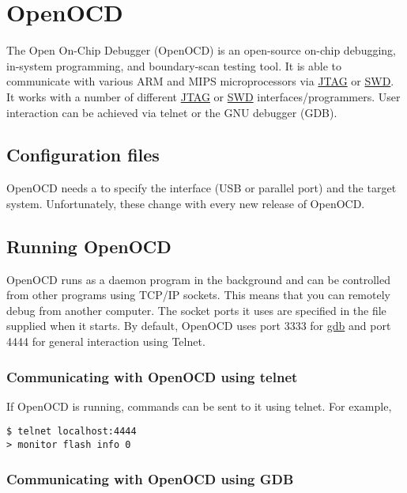 \chapter{OpenOCD}

The Open On-Chip Debugger (OpenOCD) is an open-source on-chip debugging,
in-system programming, and boundary-scan testing tool. It is able to
communicate with various ARM and MIPS microprocessors via \url{JTAG} or
\url{SWD}. It works with a number of different \url{JTAG} or \url{SWD}
interfaces/programmers. User interaction can be achieved via telnet or
the GNU debugger (GDB).

\section{Configuration files}
\label{configuration-files}

OpenOCD needs a  to
specify the interface (USB or parallel port) and the target system.
Unfortunately, these change with every new release of OpenOCD.

\section{Running OpenOCD}
\label{running-openocd}

OpenOCD runs as a daemon program in the background and can be controlled
from other programs using TCP/IP sockets. This means that you can
remotely debug from another computer. The socket ports it uses are
specified in the 
file supplied when it starts. By default, OpenOCD uses port 3333 for
\url{gdb} and port 4444 for general interaction using Telnet.

\subsection{Communicating with OpenOCD using telnet}
\label{communicating-with-openocd-using-telnet}

If OpenOCD is running, commands can be sent to it using telnet. For
example,

\begin{verbatim}
$ telnet localhost:4444
> monitor flash info 0
\end{verbatim}

\subsection{Communicating with OpenOCD using GDB}
\label{communicating-with-openocd-using-gdb}

